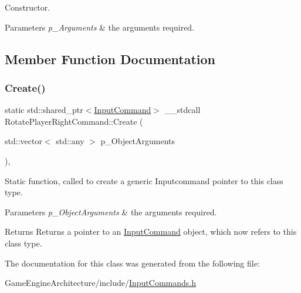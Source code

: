 Constructor. 


\begin{DoxyParams}{Parameters}
{\em p\+\_\+\+Arguments} & the arguments required. \\
\hline
\end{DoxyParams}


\subsection{Member Function Documentation}
\mbox{\label{class_rotate_player_right_command_ae26d714e86d5a851d647774494ab9841}} 
\subsubsection{\texorpdfstring{Create()}{Create()}}
{\footnotesize\ttfamily static std\+::shared\+\_\+ptr$<$\mbox{\hyperlink{class_input_command}{Input\+Command}}$>$ \+\_\+\+\_\+stdcall Rotate\+Player\+Right\+Command\+::\+Create (\begin{DoxyParamCaption}\item[{std\+::vector$<$ std\+::any $>$}]{p\+\_\+\+Object\+Arguments }\end{DoxyParamCaption})\hspace{0.3cm}{\ttfamily [inline]}, {\ttfamily [static]}}



Static function, called to create a generic Inputcommand pointer to this class type. 


\begin{DoxyParams}{Parameters}
{\em p\+\_\+\+Object\+Arguments} & the arguments required. \\
\hline
\end{DoxyParams}
\begin{DoxyReturn}{Returns}
Returns a pointer to an \mbox{\hyperlink{class_input_command}{Input\+Command}} object, which now refers to this class type. 
\end{DoxyReturn}


The documentation for this class was generated from the following file\+:\begin{DoxyCompactItemize}
\item 
Game\+Engine\+Architecture/include/\mbox{\hyperlink{_input_commands_8h}{Input\+Commands.\+h}}\end{DoxyCompactItemize}
